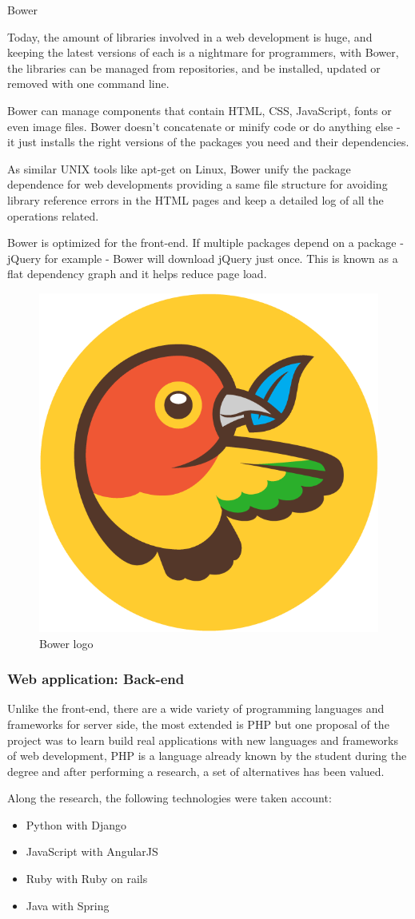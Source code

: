 \documentclass{DeustoFDP}
\begin{document}
{\large Bower}

Today, the amount of libraries involved in a web development is huge, and keeping the latest versions of each is a nightmare for programmers, with Bower, the libraries can be managed from repositories, and be installed, updated or removed with one command line.

Bower can manage components that contain HTML, CSS, JavaScript, fonts or even image files. Bower doesn’t concatenate or minify code or do anything else - it just installs the right versions of the packages you need and their dependencies.

As similar UNIX tools like apt-get on Linux, Bower unify the package dependence for web developments providing a same file structure for avoiding library reference errors in the HTML pages and keep a detailed log of all the operations related.

Bower is optimized for the front-end. If multiple packages depend on a package - jQuery for example - Bower will download jQuery just once. This is known as a flat dependency graph and it helps reduce page load. \cite{bowerio}

\begin{figure}[h]
\centering
\includegraphics[width=0.3\linewidth]{fig/Bower}
\caption[Bower logo]{Bower logo}
\label{fig:Bower}
\end{figure}


\subsubsection{Web application: Back-end}
Unlike the front-end, there are a wide variety of programming languages and frameworks for server side, the most extended is PHP but one proposal of the project was to learn build real applications with new languages and frameworks of web development, PHP is a language already known by the student during the degree and after performing a research, a set of alternatives has been valued.

Along the research, the following technologies were taken account:
\begin{itemize}
	\item Python with Django
	\item JavaScript with AngularJS
	\item Ruby with Ruby on rails
	\item Java with Spring
\end{itemize}
\end{document}
